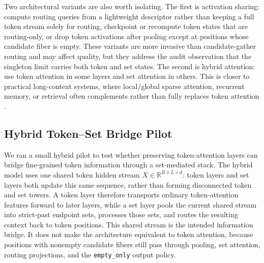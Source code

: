 \documentclass{article}
\theoremstyle{plain}
\theoremstyle{definition}
\theoremstyle{remark}
\begin{document}
	Two architectural variants are also worth isolating.  The first is activation
	sharing: compute routing queries from a lightweight descriptor rather than
	keeping a full token stream solely for routing, checkpoint or recompute token
	states that are routing-only, or drop token activations after pooling except at
	positions whose candidate fiber is empty.  These variants are more invasive than
	candidate-gather routing and may affect quality, but they address the audit
	observation that the singleton limit carries both token and set states.  The
	second is hybrid attention: use token attention in some layers and set attention
	in others.  This is closer to practical long-context systems, where local/global
	sparse attention, recurrent memory, or retrieval often complements rather than
	fully replaces token attention
	\citep{dai2019transformerxl,beltagy2020longformer,wu2022memorizing}.
	
	\subsection{Hybrid Token--Set Bridge Pilot}
	\label{sec:hybrid-token-set-pilot}
	
	We ran a small hybrid pilot to test whether preserving token-attention layers
	can bridge fine-grained token information through a set-mediated stack.  The
	hybrid model uses one shared token hidden stream $X\in\mathbb R^{B\times L\times
	d}$: token layers and set layers both update this same sequence, rather than
	forming disconnected token and set towers.  A token layer therefore transports
	ordinary token-attention features forward to later layers, while a set layer
	pools the current shared stream into strict-past endpoint sets, processes those
	sets, and routes the resulting context back to token positions.  This shared
	stream is the intended information bridge.  It does not make the architecture
	equivalent to token attention, because positions with nonempty candidate fibers
	still pass through pooling, set attention, routing projections, and the
	\texttt{empty\_only} output policy.
	
\end{document}
